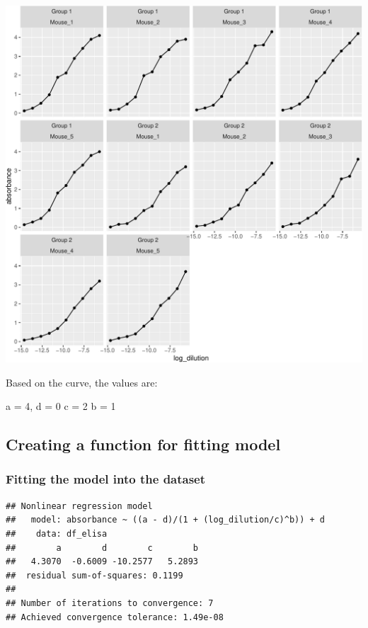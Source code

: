 \documentclass[
]{book}
\begin{document}
\begin{center}\includegraphics{csu-impactb_files/figure-latex/unnamed-chunk-50-1} \end{center}

Based on the curve, the values are:

a = 4,
d = 0
c = 2
b = 1

\subsection{Creating a function for fitting model}\label{creating-a-function-for-fitting-model}

\subsubsection{Fitting the model into the dataset}\label{fitting-the-model-into-the-dataset}

\begin{verbatim}
## Nonlinear regression model
##   model: absorbance ~ ((a - d)/(1 + (log_dilution/c)^b)) + d
##    data: df_elisa
##        a        d        c        b 
##   4.3070  -0.6009 -10.2577   5.2893 
##  residual sum-of-squares: 0.1199
## 
## Number of iterations to convergence: 7 
## Achieved convergence tolerance: 1.49e-08
\end{verbatim}
\end{document}
